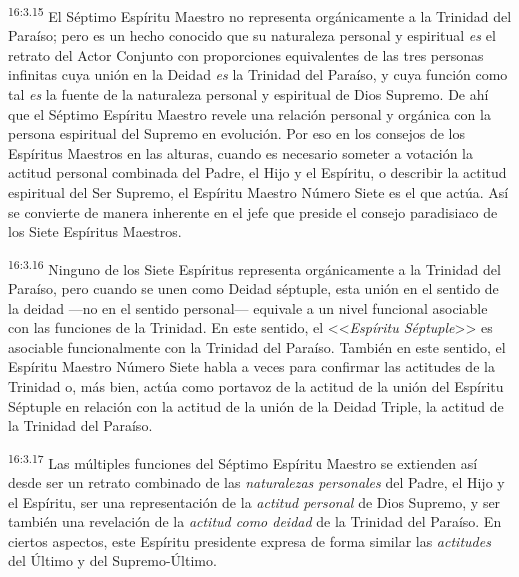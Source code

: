 \par
\textsuperscript{16:3.15} El Séptimo Espíritu Maestro no representa orgánicamente a la Trinidad del Paraíso; pero es un hecho conocido que su naturaleza personal y espiritual \textit{es} el retrato del Actor Conjunto con proporciones equivalentes de las tres personas infinitas cuya unión en la Deidad \textit{es} la Trinidad del Paraíso, y cuya función como tal \textit{es} la fuente de la naturaleza personal y espiritual de Dios Supremo. De ahí que el Séptimo Espíritu Maestro revele una relación personal y orgánica con la persona espiritual del Supremo en evolución. Por eso en los consejos de los Espíritus Maestros en las alturas, cuando es necesario someter a votación la actitud personal combinada del Padre, el Hijo y el Espíritu, o describir la actitud espiritual del Ser Supremo, el Espíritu Maestro Número Siete es el que actúa. Así se convierte de manera inherente en el jefe que preside el consejo paradisiaco de los Siete Espíritus Maestros.

\par
\textsuperscript{16:3.16} Ninguno de los Siete Espíritus representa orgánicamente a la Trinidad del Paraíso, pero cuando se unen como Deidad séptuple, esta unión en el sentido de la deidad ---no en el sentido personal--- equivale a un nivel funcional asociable con las funciones de la Trinidad. En este sentido, el <<\textit{Espíritu Séptuple}>> es asociable funcionalmente con la Trinidad del Paraíso. También en este sentido, el Espíritu Maestro Número Siete habla a veces para confirmar las actitudes de la Trinidad o, más bien, actúa como portavoz de la actitud de la unión del Espíritu Séptuple en relación con la actitud de la unión de la Deidad Triple, la actitud de la Trinidad del Paraíso.

\par
\textsuperscript{16:3.17} Las múltiples funciones del Séptimo Espíritu Maestro se extienden así desde ser un retrato combinado de las \textit{naturalezas personales} del Padre, el Hijo y el Espíritu, ser una representación de la \textit{actitud personal} de Dios Supremo, y ser también una revelación de la \textit{actitud como deidad} de la Trinidad del Paraíso. En ciertos aspectos, este Espíritu presidente expresa de forma similar las \textit{actitudes} del Último y del Supremo-Último.

